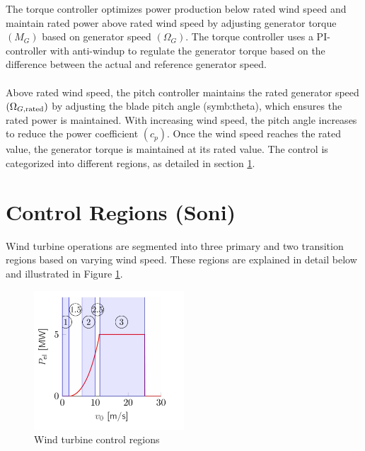 The torque controller optimizes power production below rated wind speed and maintain rated power above rated wind speed by adjusting generator torque $(M_G)$ based on generator speed $(\Omega_G)$.
The torque controller uses a PI-controller with anti-windup to regulate the generator torque based on the difference between the actual and reference generator speed.
\\
\\
Above rated wind speed, the pitch controller maintains the rated generator speed $(\Omega_{G,\textnormal{rated}})$ by adjusting the blade pitch angle (\gls{symb:theta}), which ensures the rated power is maintained.
With increasing wind speed, the pitch angle increases to reduce the power coefficient $(c_p)$.
Once the wind speed reaches the rated value, the generator torque is maintained at its rated value.
The control is categorized into different regions, as detailed in section \ref{control regions}.
\section{Control Regions (Soni)} \label{control regions}

Wind turbine operations are segmented into three primary and two transition regions based on varying wind speed. These regions are explained in detail below and illustrated in Figure \ref{fig:control regions}.

\begin{figure}[h]
	\centering
	\includegraphics[width=0.5\textwidth]{Figures/Figure_2.jpg}
	\caption{Wind turbine control regions \cite{SchlipfLecture}}
	\label{fig:control regions} 
\end{figure}

